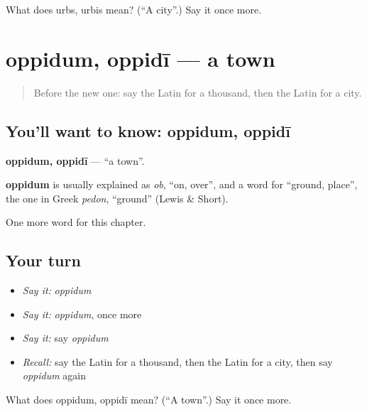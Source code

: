 \begin{tcolorbox}[breakable,colback=teal!4,colframe=teal!35!black,title={Before you move on}]
What does urbs, urbis mean? (\textquotedblleft{}A city\textquotedblright{}.) Say it once more.
\end{tcolorbox}
\section[oppidum, oppidī]{oppidum, oppidī — a town}

\label{lesson:LA-C107-oppidum}



\begin{quote}
Before the new one: say the Latin for a thousand, then the Latin for a city.
\end{quote}

\subsection*{You'll want to know: oppidum, oppidī}
\textbf{oppidum, oppidī} — \textquotedblleft{}a town\textquotedblright{}.

\begin{cousinweb}
\textbf{oppidum} is usually explained as \emph{ob}, \textquotedblleft{}on, over\textquotedblright{}, and a word for \textquotedblleft{}ground, place\textquotedblright{}, the one in Greek \emph{pedon}, \textquotedblleft{}ground\textquotedblright{} (Lewis \& Short).
\end{cousinweb}

\begin{grammarlens}[title={What you've built}]
One more word for this chapter.
\end{grammarlens}

\subsection*{Your turn}
\begin{itemize}
\raggedright
  \item \emph{Say it:} \emph{oppidum}
  \item \emph{Say it:} \emph{oppidum}, once more
  \item \emph{Say it:} say \emph{oppidum}
  \item \emph{Recall:} say the Latin for a thousand, then the Latin for a city, then say \emph{oppidum} again
\end{itemize}

\begin{tcolorbox}[breakable,colback=teal!4,colframe=teal!35!black,title={Before you move on}]
What does oppidum, oppidī mean? (\textquotedblleft{}A town\textquotedblright{}.) Say it once more.
\end{tcolorbox}
